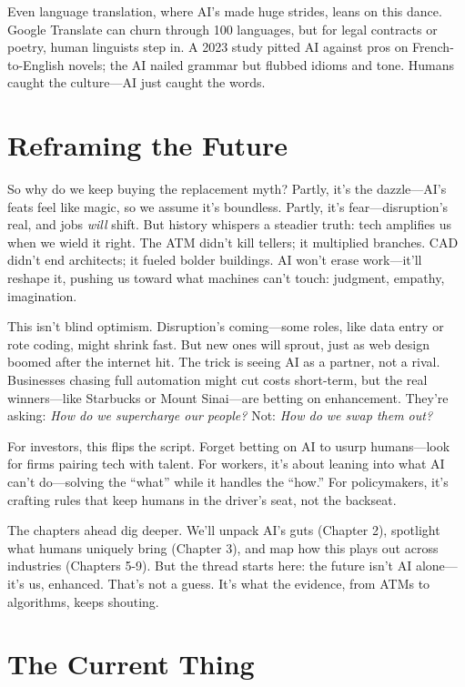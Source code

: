 \documentclass[
  Letterpaper,
]{scrbook}
\begin{document}
Even language translation, where AI's made huge strides, leans on this
dance. Google Translate can churn through 100 languages, but for legal
contracts or poetry, human linguists step in. A 2023 study pitted AI
against pros on French-to-English novels; the AI nailed grammar but
flubbed idioms and tone. Humans caught the culture---AI just caught the
words.

\section{Reframing the Future}\label{reframing-the-future}

So why do we keep buying the replacement myth? Partly, it's the
dazzle---AI's feats feel like magic, so we assume it's boundless.
Partly, it's fear---disruption's real, and jobs \emph{will} shift. But
history whispers a steadier truth: tech amplifies us when we wield it
right. The ATM didn't kill tellers; it multiplied branches. CAD didn't
end architects; it fueled bolder buildings. AI won't erase work---it'll
reshape it, pushing us toward what machines can't touch: judgment,
empathy, imagination.

This isn't blind optimism. Disruption's coming---some roles, like data
entry or rote coding, might shrink fast. But new ones will sprout, just
as web design boomed after the internet hit. The trick is seeing AI as a
partner, not a rival. Businesses chasing full automation might cut costs
short-term, but the real winners---like Starbucks or Mount Sinai---are
betting on enhancement. They're asking: \emph{How do we supercharge our
people?} Not: \emph{How do we swap them out?}

For investors, this flips the script. Forget betting on AI to usurp
humans---look for firms pairing tech with talent. For workers, it's
about leaning into what AI can't do---solving the ``what'' while it
handles the ``how.'' For policymakers, it's crafting rules that keep
humans in the driver's seat, not the backseat.

The chapters ahead dig deeper. We'll unpack AI's guts (Chapter 2),
spotlight what humans uniquely bring (Chapter 3), and map how this plays
out across industries (Chapters 5-9). But the thread starts here: the
future isn't AI alone---it's us, enhanced. That's not a guess. It's what
the evidence, from ATMs to algorithms, keeps shouting.

\section{The Current Thing}\label{the-current-thing}
\end{document}
